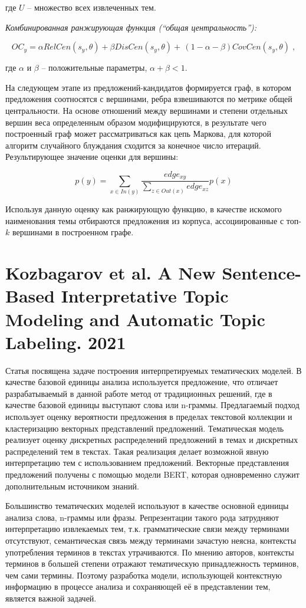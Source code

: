 \noindent где $U$ -- множество всех извлеченных тем.

\textit{Комбинированная ранжирующая функция (``общая центральность''):}

\[OC_{y} =\alpha RelCen(s_{y},\theta)+\beta DisCen(s_{y},\theta) +\,(1-\alpha -\beta)CovCen(s_{y},\theta) \;,\]

\noindent где $\alpha$ и $\beta$ -- положительные параметры, $\alpha + \beta < 1$.

На следующем этапе из предложений-кандидатов формируется граф, в котором предложения соотносятся с вершинами, ребра взвешиваются по метрике общей центральности. На основе отношений между вершинами и степени отдельных вершин веса определенным образом модифицируются, в результате чего построенный граф может рассматриваться как цепь Маркова, для которой алгоритм случайного блуждания сходится за конечное число итераций. Результирующее значение оценки для вершины:

\[  p(y)=\sum \limits _{x\in In(y)} {\frac {edge_{xy}}{\sum \nolimits _{z\in Out(x)} {edge_{xz}}}} p(x) \]

Используя данную оценку как ранжирующую функцию, в качестве искомого наименования темы отбираются предложения из корпуса, ассоциированные с топ-$k$ вершинами в построенном графе.  



\section{Kozbagarov et al. A New Sentence-Based Interpretative Topic Modeling and Automatic Topic Labeling. 2021}

Статья посвящена задаче построения интерпретируемых тематических моделей. В качестве базовой единицы анализа используется предложение, что отличает разрабатываемый в данной работе метод от традиционных решений, где в качестве базовой единицы выступают слова или n-граммы. Предлагаемый подход использует оценку вероятности предложения в пределах текстовой коллекции и кластеризацию векторных представлений предложений. Тематическая модель реализует оценку дискретных распределений предложений в темах и дискретных распределений тем в текстах. Такая реализация делает возможной явную интерпретацию тем с использованием предложений. Векторные представления предложений получены с помощью модели BERT, которая одновременно служит дополнительным источником знаний.

Большинство тематических моделей используют в качестве основной единицы анализа слова, n-граммы или фразы. Репрезентации такого рода затрудняют интерпретацию извлекаемых тем, т.к. грамматические связи между терминами отсутствуют, семантическая связь между терминами зачастую неясна, контексты употребления терминов в текстах утрачиваются. По мнению авторов, контексты терминов в большей степени отражают тематическую принадлежность терминов, чем сами термины. Поэтому разработка модели, использующей контекстную информацию в процессе анализа и сохраняющей её в представлении тем, является важной задачей.

